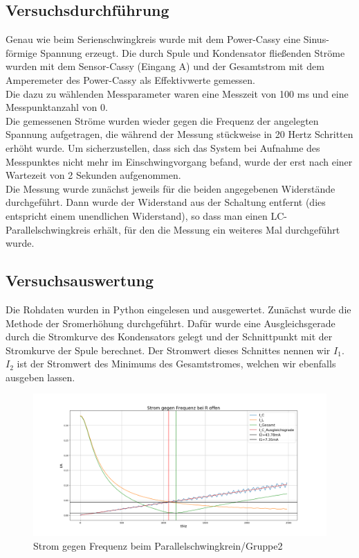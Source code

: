 \documentclass[a4paper, 11pt]{article}
\begin{document}
\subsection{Versuchsdurchführung}
Genau wie beim Serienschwingkreis wurde mit dem Power-Cassy eine Sinus-förmige Spannung erzeugt. Die durch Spule und Kondensator fließenden Ströme wurden mit dem Sensor-Cassy (Eingang A) und der Gesamtstrom mit dem Amperemeter des Power-Cassy als Effektivwerte gemessen.\\
Die dazu zu wählenden Messparameter waren eine Messzeit von 100 ms und eine Messpunktanzahl von 0.\\
Die gemessenen Ströme wurden wieder gegen die Frequenz der angelegten Spannung aufgetragen, die während der Messung stückweise in 20 Hertz Schritten erhöht wurde. Um sicherzustellen, dass sich das System bei Aufnahme des Messpunktes nicht mehr im Einschwingvorgang befand, wurde der erst nach einer Wartezeit von 2 Sekunden aufgenommen.\\
Die Messung wurde zunächst jeweils für die beiden angegebenen Widerstände durchgeführt. Dann wurde der Widerstand aus der Schaltung entfernt (dies entspricht einem unendlichen Widerstand), so dass man einen LC-Parallelschwingkreis erhält, für den die Messung ein weiteres Mal durchgeführt wurde.

\subsection{Versuchsauswertung}
Die Rohdaten wurden in Python eingelesen und ausgewertet. \newline
Zunächst wurde die Methode der Sromerhöhung durchgeführt. Dafür wurde eine Ausgleichsgerade durch die Stromkurve des Kondensators gelegt und der Schnittpunkt mit der Stromkurve der Spule berechnet. Der Stromwert dieses Schnittes nennen wir $ I_1$. $I_2$ ist der Stromwert des Minimums des Gesamtstromes, welchen wir ebenfalls ausgeben lassen.

\begin{figure}[H]

	\hskip -2.5cm
	\includegraphics[trim = 0mm 0mm 0mm 0mm,clip, width=20cm]{Bilder/DPParalleloo_Erhoehung.png}%
	\caption[Strom gegen Frequenz beim Parallelschwingkrein/Gruppe2]{Strom gegen Frequenz beim Parallelschwingkrein/Gruppe2}%
	\label{pic:Abbildung 2}%

\end{figure}
\end{document}
